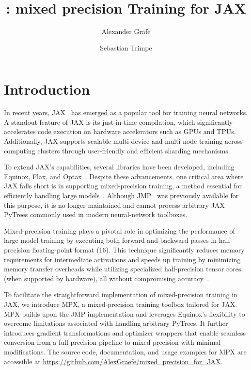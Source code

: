 \documentclass[10pt, a4paper, logo, onecolumn, internal, copyright]{dsme}
\title{\mpx{}: mixed precision Training for JAX}
\author[1]{Alexander Gräfe}
\author[1]{Sebastian Trimpe}
\affil[1]{RWTH Aachen University}
\date{}
\newcommand{\mpx}{\textsc{MPX}}
\begin{document}
\sloppy
\maketitle

\section{Introduction}

In recent years, JAX~\citep{deepmind2020jax} has emerged as a popular tool for training neural networks. 
A standout feature of JAX is its just-in-time compilation, which significantly accelerates code execution on hardware accelerators such as GPUs and TPUs. 
Additionally, JAX supports scalable multi-device and multi-node training across computing clusters through user-friendly and efficient sharding mechanisms.

To extend JAX's capabilities, several libraries have been developed, including Equinox, Flax, and Optax~\citep{kidger2021equinox,flax2020github,deepmind2020jax}. 
Despite these advancements, one critical area where JAX falls short is in supporting mixed-precision training, a method essential for efficiently handling large models~\cite{mixed_precision_paper}. 
Although JMP~\citep{jmp} was previously available for this purpose, it is no longer maintained and cannot process arbitrary JAX PyTrees commonly used in modern neural-network toolboxes.

Mixed-precision training plays a pivotal role in optimizing the performance of large model training by executing both forward and backward passes in half-precision floating-point format (\qty{16}{\bit}). 
This technique significantly reduces memory requirements for intermediate activations and speeds up training by minimizing memory transfer overheads while utilizing specialized half-precision tensor cores (when supported by hardware), all without compromising accuracy~\cite{mixed_precision_paper}.

To facilitate the straightforward implementation of mixed-precision training in JAX, we introduce \mpx{}, a mixed-precision training toolbox tailored for JAX. 
\mpx{} builds upon the JMP implementation and leverages Equinox's flexibility to overcome limitations associated with handling arbitrary PyTrees. 
It further introduces gradient transformations and optimizer wrappers that enable seamless conversion from a full-precision pipeline to mixed precision with minimal modifications. The source code, documentation, and usage examples for \mpx{} are accessible at \url{https://github.com/AlexGraefe/mixed_precision_for_JAX}.
\end{document}
